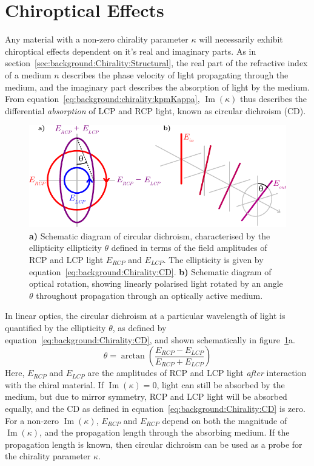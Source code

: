 \section{Chiroptical Effects}\label{sec:background:Chirality:Chiroptics}
Any material with a non-zero chirality parameter $\kappa$ will necessarily exhibit chiroptical effects dependent on it's real and imaginary parts. As in section~\ref{sec:background:Chirality:Structural}, the real part of the refractive index of a medium $n$ describes the phase velocity of light propagating through the medium, and the imaginary part describes the absorption of light by the medium. From equation~\ref{eq:background:chirality:kpmKappa}, $\operatorname{Im}(\kappa)$ thus describes the differential \textit{absorption} of LCP and RCP light, known as circular dichroism (CD). 
\begin{figure}[htb!]
    \centering
    \includegraphics[scale=1.0]{./figures/background/chiroptics/cdor.pdf}
    \caption{\label{fig:background:Chirality:cdor}\textbf{a)} Schematic diagram of circular dichroism, characterised by the ellipticity ellipticity $\theta$ defined in terms of the field amplitudes of RCP and LCP light $E_{RCP}$ and $E_{LCP}$. The ellipticity is given by equation~\ref{eq:background:Chirality:CD}. \textbf{b)} Schematic diagram of optical rotation, showing linearly polarised light rotated by an angle $\theta$ throughout propagation through an optically active medium.}
\end{figure}
In linear optics, the circular dichroism at a particular wavelength of light is quantified by the ellipticity $\theta$, as defined by equation~\ref{eq:background:Chirality:CD}, and shown schematically in figure~\ref{fig:background:Chirality:cdor}a. 
\begin{equation}\label{eq:background:Chirality:CD}
    \theta = \arctan\left( \frac{E_{RCP} - E_{LCP}}{E_{RCP} + E_{LCP}} \right)
\end{equation} 
Here, $E_{RCP}$ and $E_{LCP}$ are the amplitudes of RCP and LCP light \textit{after} interaction with the chiral material. If $\operatorname{Im}(\kappa) = 0$, light can still be absorbed by the medium, but due to mirror symmetry, RCP and LCP light will be absorbed equally, and the CD as defined in equation~\ref{eq:background:Chirality:CD} is zero. For a non-zero $\operatorname{Im}(\kappa)$, $E_{RCP}$ and $E_{RCP}$ depend on both the magnitude of $\operatorname{Im}(\kappa)$, and the propagation length through the absorbing medium. If the propagation length is known, then circular dichroism can be used as a probe for the chirality parameter $\kappa$.
